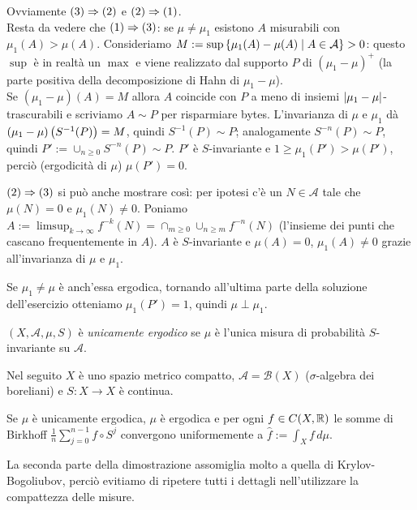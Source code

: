 \begin{soluz}Ovviamente $(3)\Rightarrow (2)$ e $(2)\Rightarrow (1)$. \\
Resta da vedere che $(1)\Rightarrow (3)$: se $\mu\neq\mu_1$ esistono $A$ misurabili con $\mu_1(A)>\mu(A)$.
Consideriamo $M:=\sup\left\{\mu_1(A)-\mu(A)\mid A\in\mathcal{A}\right\}>0$: questo $\sup$ è in realtà un $\max$
e viene realizzato dal supporto $P$ di $(\mu_1-\mu)^+$ (la parte positiva della decomposizione di Hahn di $\mu_1-\mu$). \\
Se $(\mu_1-\mu)(A)=M$ allora $A$ coincide con $P$ a meno di insiemi $\left|\mu_1-\mu\right|$-trascurabili e scriviamo
$A\sim P$ per risparmiare bytes.
L'invarianza di $\mu$ e $\mu_1$ dà $(\mu_1-\mu)\left(S^{-1}(P)\right)=M$, quindi $S^{-1}(P)\sim P$; analogamente $S^{-n}(P)\sim P$,
quindi $P':=\cup_{n\ge 0}S^{-n}(P)\sim P$. $P'$ è $S$-invariante e $1\ge \mu_1(P')>\mu(P')$, perciò
(ergodicità di $\mu$) $\mu(P')=0$.
\end{soluz}

\begin{oss}$(2)\Rightarrow (3)$ si può anche mostrare così: per ipotesi c'è un $N\in\mathcal{A}$ tale che $\mu(N)=0$ e $\mu_1(N)\neq 0$.
Poniamo $A:=\limsup_{k\to\infty}f^{-k}(N)=\cap_{m\ge 0}\cup_{n\ge m}f^{-n}(N)$ (l'insieme dei punti che
cascano frequentemente in $A$). $A$ è $S$-invariante e $\mu(A)=0$, $\mu_1(A)\neq 0$ grazie all'invarianza di $\mu$ e $\mu_1$.
\end{oss}

\begin{oss}Se $\mu_1\neq\mu$ è anch'essa ergodica, tornando all'ultima parte della soluzione dell'esercizio
otteniamo $\mu_1(P')=1$, quindi $\mu\perp\mu_1$.
\end{oss}

\begin{defi}$(X,\mathcal{A},\mu,S)$ è \emph{unicamente ergodico} se $\mu$ è l'unica misura di probabilità
$S$-invariante su $\mathcal{A}$.
\end{defi}

Nel seguito $X$ è uno spazio metrico compatto, $\mathcal{A}=\mathcal{B}(X)$ ($\sigma$-algebra dei boreliani)
e $S:X\to X$ è continua.

\begin{teo}Se $\mu$ è unicamente ergodica, $\mu$ è ergodica e per ogni $f\in C(X,\mathbb{R})$
le somme di Birkhoff $\frac{1}{n}\sum_{j=0}^{n-1}f\circ S^j$ convergono uniformemente a $\widehat{f}:=\int_X f\,d\mu$.
\end{teo}

La seconda parte della dimostrazione assomiglia molto a quella di Krylov-Bogoliubov,
perciò evitiamo di ripetere tutti i dettagli nell'utilizzare la compattezza delle misure.


